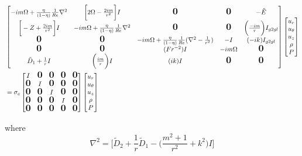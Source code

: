 \documentclass{article}
\newcommand{\bigzero}{\mbox{\normalfont\Large\bfseries 0}}
\begin{document}
\begin{align}\label{eq:hoc_interpolate_face_to_center_naive}
 \begin{split}
 &\begin{bmatrix}%
    -im\Omega +  \frac{\eta}{(1-\eta)} \frac{1}{Re} \nabla^{2} 
  & \bigg[2\Omega - \frac{2im}{r^{2}}\bigg] I
  & \bigzero 
  & \bigzero
  & -\tilde{E}\\
\bigg[-Z + \frac{2im}{r^{2}}\bigg] I 
& -im\Omega +  \frac{\eta}{(1-\eta)} \frac{1}{Re}\nabla^{2} 
& \bigzero &  \bigzero & \bigg(\frac{-im}{r}\bigg)I_{g2gl}\\
%
  \bigzero  & \bigzero & -im\Omega +  \frac{\eta}{(1-\eta)} \frac{1}{Re}(\nabla^{2} - \frac{1}{r^{2}})& -I & (-ik)I_{g2gl}\\
%
  \bigzero  & \bigzero  & (Fr^{-2})I  & -im\Omega & \bigzero\\
  \tilde{D}_{1} + \frac{1}{r}I & \bigg(\frac{im}{r}\bigg)I & (ik)I & \bigzero & \bigzero\\
\end{bmatrix}
\begin{bmatrix}
 u_{r}\\
 u_{\theta}\\
 u_{z}\\
 \rho\\
 P\\
 \end{bmatrix}\\
&= \sigma_{c} 
\begin{bmatrix}
 I & \bigzero & \bigzero & \bigzero & \bigzero\\
%
%
 \bigzero & I & \bigzero & \bigzero & \bigzero\\
%
%
  \bigzero & \bigzero & I & \bigzero & \bigzero\\
%
%
  \bigzero & \bigzero & \bigzero & I & \bigzero\\
%
  \bigzero & \bigzero & \bigzero & \bigzero & \bigzero\\
\end{bmatrix}
\begin{bmatrix}
 u_{r}\\
 u_{\theta}\\
 u_{z}\\
 \rho\\
 P\\
 \end{bmatrix}
 \end{split}
\end{align}

where
\begin{equation}
 \nabla^{2} = \bigg[\tilde{D}_{2} + \frac{1}{r}\tilde{D}_{1} - \bigg( \frac{m^{2} + 1}{r^{2}} + k^{2}\bigg)I\bigg]
\end{equation}
\end{document}

